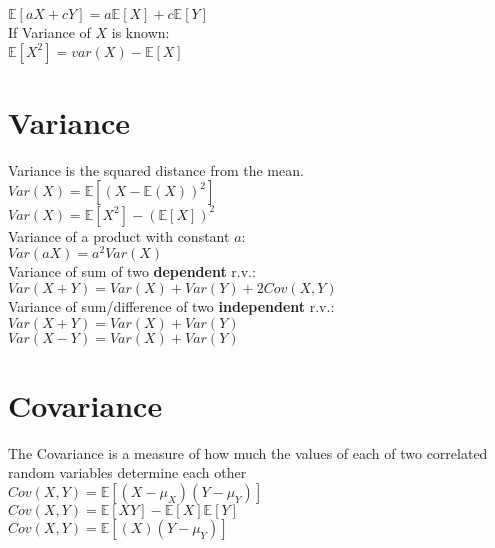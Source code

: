 $\mathbb{E}[aX + c Y] = a\mathbb{E}[X] + c\mathbb{E}[Y]$\\

If Variance of $X$ is known:\\

$\mathbb{E}[X^2] = var(X) - \mathbb{E}[X]$\\


\section{Variance}

Variance is the squared distance from the mean.\\

$Var(X)=\mathbb{E}[(X-\mathbb{E}(X))^2]$\\

$Var\left(X\right)=\mathbb{E}\left[X^2\right]-\left(\mathbb{E}\left[X\right]\right)^2$\\

Variance of a product with constant $a$:\\

$Var(aX)=a^2 Var\left(X\right)$\\

Variance of sum of two \textbf{dependent} r.v.:\\

$Var(X + Y)=Var(X)+Var(Y)+2Cov(X,Y)$\\

Variance of sum/difference of two \textbf{independent} r.v.:\\

$Var(X + Y)=Var(X)+Var(Y)$\\

$Var(X - Y)=Var(X)+Var(Y)$\\

\section{Covariance}

The Covariance is a measure of how much the values of each of two correlated random variables determine each other\\

$Cov(X,Y) = \mathbb E[(X - \mu _ X)(Y - \mu _ Y)]$ \\

$Cov(X,Y) = \mathbb E[XY] - \mathbb E[X]\mathbb E[Y] $\\

$ Cov(X,Y)= \displaystyle  \mathbb E[(X)(Y-\mu _ Y)]$\\

